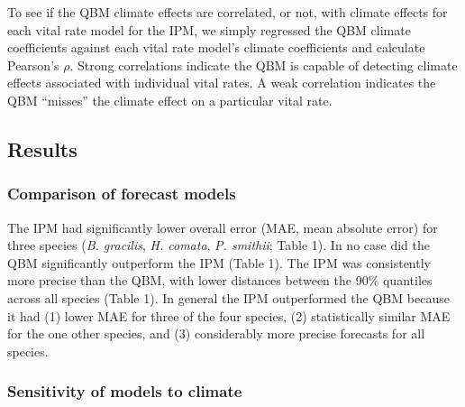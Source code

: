 \documentclass[12pt,]{article}
\begin{document}
To see if the QBM climate effects are correlated, or not, with climate
effects for each vital rate model for the IPM, we simply regressed the
QBM climate coefficients against each vital rate model's climate
coefficients and calculate Pearson's $\rho$. Strong correlations
indicate the QBM is capable of detecting climate effects associated with
individual vital rates. A weak correlation indicates the QBM ``misses''
the climate effect on a particular vital rate.

\subsection{Results}\label{results}

\subsubsection{Comparison of forecast
models}\label{comparison-of-forecast-models}

The IPM had significantly lower overall error (MAE, mean absolute error)
for three species (\emph{B. gracilis}, \emph{H. comata}, \emph{P.
smithii}; Table 1). In no case did the QBM significantly outperform the
IPM (Table 1). The IPM was consistently more precise than the QBM, with
lower distances between the 90\% quantiles across all species (Table 1).
In general the IPM outperformed the QBM because it had (1) lower MAE for
three of the four species, (2) statistically similar MAE for the one
other species, and (3) considerably more precise forecasts for all
species.

\subsubsection{Sensitivity of models to
climate}\label{sensitivity-of-models-to-climate}
\end{document}
